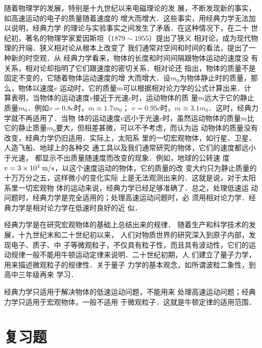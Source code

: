    随着物理学的发展，特别是十九世纪以来电磁理论的发
展，不断发现新的事实，如高速运动的电子的质量随着速度的
增大而增大．这些事实，用经典力学无法加以说明，经典力学
的理论与实验事实之间发生了矛盾．在这种情况下，在二十
世纪初，著名的物理学家爱因斯坦（$1879 \sim 1955$）提出了狭义
相对论，成为现代物理的开端．狭义相对论从根本上改变了
我们通常对空间和时间的看法，提出了一种新的时空观．从
经典力学看来，物体的长度和时间间隔跟物体运动的速度没
有关系，相对论却指明了它们跟速度的密切关系．相对论还
指出，物体的质量不是固定不变的，它随着物体运动速度的增
大而增大．设$m_0$为物体静止时的质量，那么，物体以速度$v$
运动时，它的质量$m$可以根据相对论力学的公式计算出来．计
算表明，当物体的运动速度$v$接近于光速$c$时，运动物体的质
量$m$远大于它的静止质量$m_0$．例如$v=0.8c$时，$m\approx 1.7m_0$；
$v=0.95c$时，$m\approx 3.1m_0$．这时，经典力学就不再适用了．当物
体的运动速度$v$远小于光速$c$时，虽然运动物体的质量$m$比
它的静止质量$m_0$要大，但相差甚微，可以不予考虑，而认为运
动物体的质量没有改变，经典力学仍旧适用．实际上，太阳系
里的一切宏观物体，如行星、卫星、人造飞船、地球上的各种交
通工具以及我们通常研究的物体，它们的速度都远小于光速，
都显示不出质量随速度而改变的现象．例如，地球的公转速
度$v=3\times 10^4\;\text{m}/\text{s}$，以这个速度运动的物体，它的质量的改
变大约只为静止质量的十万万分之五，这样微小的变化实际
上是无法观测出来的．这就是说，对于太阳系里一切宏观物
体的运动来说，经典力学已经足够准确了．总之，处理低速运
动问题时，经典力学是完全适用的；处理高速运动问题时，必
须用相对论力学．经典力学是相对论力学在低速时良好的近
似．

    经典力学是在研究宏观物体的基础上总结出来的规律．
随着生产和科学技术的发展，十九世纪末和二十世纪初以来，
人们对物质世界的研究深入到原子内部，发现电子、质子、中
子等微观粒子，不仅具有粒子性，而且具有波动性，它们的运
动规律一般不能用牛顿运动定律来说明．二十世纪初期，人
们建立了量子力学，用来描述微观粒子的规律性．关于量子
力学的基本观念，如所谓波粒二象性，到高中三年级再来
学习．

经典力学只适用于解决物体的低速运动问题，不能用来
处理高速运动问题；经典力学只适用于宏观物体，一般不适用
于微观粒子．这就是牛顿定律的适用范围．

\section*{复习题}

